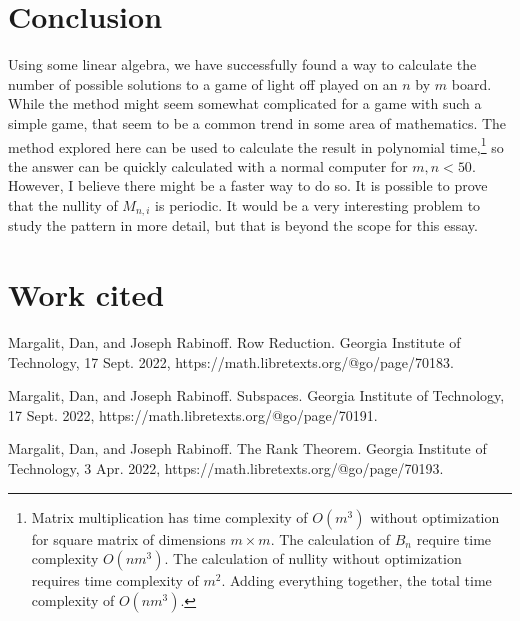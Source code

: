 \documentclass[a4paper, 12pt]{article}
\begin{document}
\clearpage
\section{Conclusion}
Using some linear algebra, we have successfully found a way to calculate the number of possible solutions to a game of light off played on an $n$ by $m$ board. While the method might seem somewhat complicated for a game with such a simple game, that seem to be a common trend in some area of mathematics. The method explored here can be used to calculate the result in polynomial time,\footnote{ Matrix multiplication has time complexity of $O(m^3)$ without optimization for square matrix of dimensions $m\times m$. The calculation of $B_n$ require time complexity $O(nm^3)$. The calculation of nullity without optimization requires time complexity of $m^2$. Adding everything together, the total time complexity of $O(nm^3)$.} so the answer can be quickly calculated with a normal computer for $m,n<50$. However, I believe there might be a faster way to do so. It is possible to prove that the nullity of $M_{n,i}$ is periodic. It would be a very interesting problem to study the pattern in more detail, but that is beyond the scope for this essay.

\clearpage
\section{Work cited}
\begin{description}


\item Margalit, Dan, and Joseph Rabinoff. Row Reduction. Georgia Institute of Technology, 17 Sept. 2022, https://math.libretexts.org/@go/page/70183. 


\item Margalit, Dan, and Joseph Rabinoff. Subspaces. Georgia Institute of Technology, 17 Sept. 2022, https://math.libretexts.org/@go/page/70191. 

\item Margalit, Dan, and Joseph Rabinoff. The Rank Theorem. Georgia Institute of Technology, 3 Apr. 2022, https://math.libretexts.org/@go/page/70193. 

\end{description}
\end{document}
